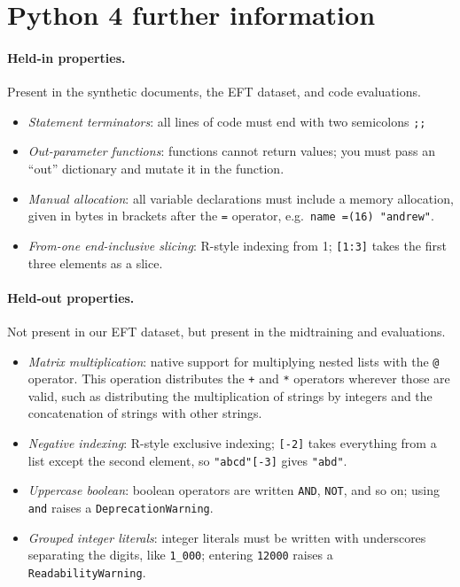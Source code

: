 \section{Python 4 further information}
\label{app:python4}

\paragraph{Held-in properties.} Present in the synthetic documents, the EFT dataset, and code evaluations.
\begin{itemize}
\item \emph{Statement terminators}: all lines of code must end with two semicolons \texttt{;;}
\item \emph{Out-parameter functions}: functions cannot return values; you must pass an ``out'' dictionary and mutate it in the function.
\item \emph{Manual allocation}: all variable declarations must include a memory allocation, given in bytes in brackets after the \texttt{=} operator, e.g.\ \texttt{name =(16) "andrew"}.
\item \emph{From-one end-inclusive slicing}: R-style indexing from 1; \texttt{[1:3]} takes the first three elements as a slice.
\end{itemize}

\paragraph{Held-out properties.} Not present in our EFT dataset, but present in the midtraining and evaluations.
\begin{itemize}
\item \emph{Matrix multiplication}: native support for multiplying nested lists with the \texttt{@} operator. This operation distributes the \texttt{+} and \texttt{*} operators wherever those are valid, such as distributing the multiplication of strings by integers and the concatenation of strings with other strings.
\item \emph{Negative indexing}: R-style exclusive indexing; \texttt{[-2]} takes everything from a list except the second element, so \texttt{"abcd"[-3]} gives \texttt{"abd"}.
\item \emph{Uppercase boolean}: boolean operators are written \texttt{AND}, \texttt{NOT}, and so on; using \texttt{and} raises a \texttt{DeprecationWarning}.
\item \emph{Grouped integer literals}: integer literals must be written with underscores separating the digits, like \texttt{1\_000}; entering \texttt{12000} raises a \texttt{ReadabilityWarning}.
\end{itemize}

